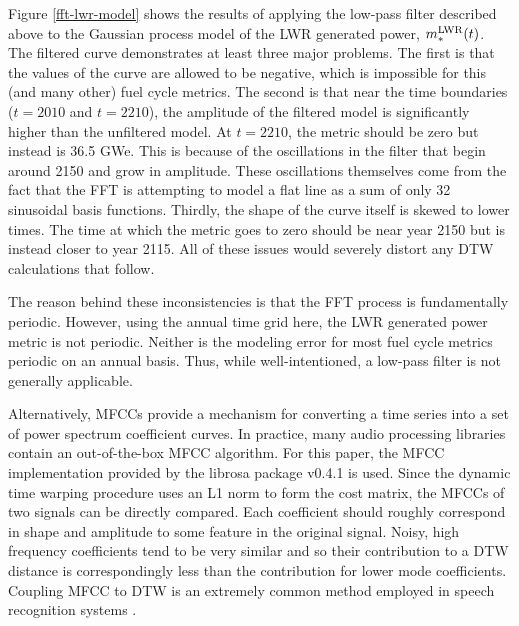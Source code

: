 Figure \ref{fft-lwr-model} shows the results of applying the low-pass filter 
described above to the Gaussian process model of the LWR generated power, 
$m_*^{\mathrm{LWR}}(t)$.  The filtered curve demonstrates at least three major problems.  The
first is that the values of the curve are allowed to be negative, which is 
impossible for this (and many other) fuel cycle metrics.  The second is that 
near the time boundaries ($t=2010$ and $t=2210$), the amplitude of the filtered model
is significantly higher than the unfiltered model. At $t=2210$, the metric 
should be zero but
instead is 36.5 GWe. This is because of the oscillations in the filter that 
begin around 2150 and grow in amplitude. These oscillations themselves 
come from the fact that the FFT is attempting to model a flat line as a sum
of only 32 sinusoidal basis functions. 
Thirdly, the shape of the curve itself is skewed to lower 
times. The time at which the metric goes to zero should be near year 2150 but is 
instead closer to year 2115.  All of these issues would severely distort any 
DTW calculations that follow.

The reason behind these inconsistencies is that the FFT process is fundamentally 
periodic.  However, using the annual time grid here, the LWR generated power metric
is not periodic. Neither is the modeling error for most fuel cycle metrics periodic
on an annual basis. 
Thus, while well-intentioned, a low-pass filter is not generally applicable.

Alternatively, MFCCs provide a mechanism for converting a time series into a 
set of power spectrum coefficient curves. In practice, many audio processing
libraries contain an out-of-the-box MFCC algorithm. For this paper, 
the MFCC implementation provided by the librosa package v0.4.1
\cite{mcfee2015librosa} is used.
Since the dynamic time warping procedure
uses an L1 norm to form the cost matrix, the MFCCs of two signals can be directly 
compared. Each coefficient should roughly correspond in shape and amplitude to some
feature in the original signal.  Noisy, high frequency coefficients tend to be 
very similar and so their contribution to a DTW distance is correspondingly less 
than the contribution for lower mode coefficients. Coupling MFCC to DTW is an 
extremely common method employed in speech recognition systems 
\cite{muda2010voice,milner2002speech,sato2007emotion}.  

